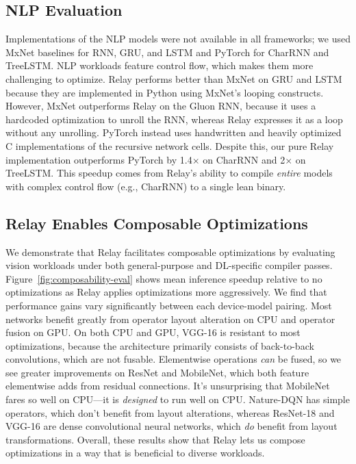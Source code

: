 \subsection*{NLP Evaluation}
Implementations of the NLP models were not available in all frameworks;
  we used MxNet baselines for RNN, GRU, and LSTM and PyTorch for CharRNN and TreeLSTM.
NLP workloads feature control flow,
  which makes them more challenging to optimize.
Relay performs better than MxNet on GRU and LSTM
  because they are implemented in Python using
  MxNet's looping constructs.
However,
  MxNet outperforms Relay on the Gluon RNN,
  because it uses a hardcoded optimization to unroll the RNN,
  whereas Relay expresses it as a loop without any unrolling.
PyTorch instead uses handwritten and heavily optimized
  C implementations of the recursive network cells.
Despite this,
  our pure Relay implementation outperforms PyTorch by 1.4$\times$ on
  CharRNN and 2$\times$ on TreeLSTM.
This speedup comes from Relay's ability to compile \textit{entire}
  models with complex control flow (e.g., CharRNN) to a single lean binary.

\subsection{Relay Enables Composable Optimizations}
\label{sec:eval_opts}

We demonstrate that Relay facilitates composable optimizations
  by evaluating vision workloads under both general-purpose and DL-specific compiler passes.
Figure~\ref{fig:composability-eval} shows mean inference speedup relative to
  no optimizations as Relay applies optimizations more aggressively.
We find that performance gains vary significantly between each device-model pairing.
Most networks benefit greatly from operator layout alteration on CPU and operator fusion on GPU.
On both CPU and GPU,
  VGG-16 is resistant to most optimizations,
  because the architecture primarily consists of back-to-back convolutions,
  which are not fusable.
Elementwise operations \textit{can} be fused,
  so we see greater improvements on ResNet and MobileNet,
  which both feature elementwise adds from residual connections.
It's unsurprising that MobileNet fares so well on CPU---it is \textit{designed} to run well on CPU.
Nature-DQN has simple operators,
  which don't benefit from layout alterations,
  whereas ResNet-18 and VGG-16 are dense convolutional neural networks,
  which \textit{do} benefit from layout transformations.
Overall, these results show that Relay lets us compose optimizations
  in a way that is beneficial to diverse workloads.


